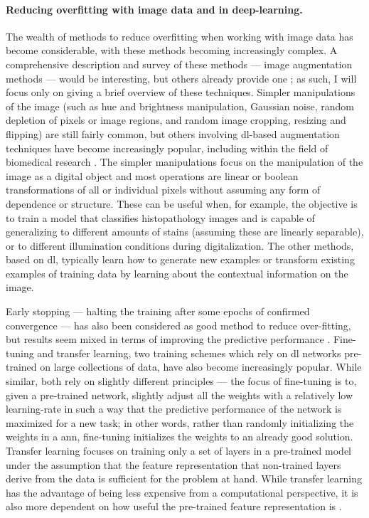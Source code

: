 \paragraph{Reducing overfitting with image data and in deep-learning.} The wealth of methods to reduce overfitting when working with image data has become considerable, with these methods becoming increasingly complex. A comprehensive description and survey of these methods --- image augmentation methods --- would be interesting, but others already provide one \cite{Shorten2019-hr}; as such, I will focus only on giving a brief overview of these techniques. Simpler manipulations of the image (such as hue and brightness manipulation, Gaussian noise, random depletion of pixels or image regions, and random image cropping, resizing and flipping) are still fairly common, but others involving \ac{dl}-based augmentation techniques have become increasingly popular, including within the field of biomedical research \cite{Shorten2019-hr}. The simpler manipulations focus on the manipulation of the image as a digital object and most operations are linear or boolean transformations of all or individual pixels without assuming any form of dependence or structure. These can be useful when, for example, the objective is to train a model that classifies histopathology images and is capable of generalizing to different amounts of stains (assuming these are linearly separable), or to different illumination conditions during digitalization. The other methods, based on \ac{dl}, typically learn how to generate new examples or transform existing examples of training data by learning about the contextual information on the image.

Early stopping --- halting the training after some epochs of confirmed convergence --- has also been considered as good method to reduce over-fitting, but results seem mixed in terms of improving the predictive performance \cite{Prechelt2012-xf}. Fine-tuning and transfer learning, two training schemes which rely on \ac{dl} networks pre-trained on large collections of data, have also become increasingly popular. While similar, both rely on slightly different principles --- the focus of fine-tuning is to, given a pre-trained network, slightly adjust all the weights with a relatively low learning-rate in such a way that the predictive performance of the network is maximized for a new task; in other words, rather than randomly initializing the weights in a \ac{ann}, fine-tuning initializes the weights to an already good solution. Transfer learning focuses on training only a set of layers in a pre-trained model under the assumption that the feature representation that non-trained layers derive from the data is sufficient for the problem at hand. While transfer learning has the advantage of being less expensive from a computational perspective, it is also more dependent on how useful the pre-trained feature representation is \cite{transfer-learning-fine-tuning}. 

